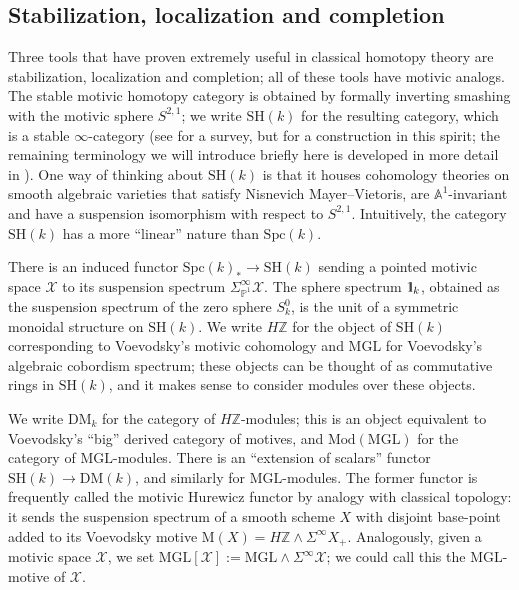 \documentclass[11pt,leqno]{article}
\newcommand{\Z}{{\mathbb Z}}
\newcommand{\aone}{{\mathbb A}^1}
\newcommand{\pone}{{\mathbb P}^1}
\renewcommand{\1}{{\rm 1\hspace*{-0.4ex}%
\rule{0.1ex}{1.52ex}\hspace*{0.2ex}}}
\newcommand{\SH}{{\mathrm{SH}}}
\newcommand{\Spc}{\mathrm{Spc}}
\newcommand{\<}[1]{{\langle}#1 {\rangle}}
\newcounter{intro}
\theoremstyle{plain}
\theoremstyle{definition}
\theoremstyle{remark}
\numberwithin{equation}{subsection}
\begin{document}
\subsection{Stabilization, localization and completion}
\label{ss:stabloccomp}
Three tools that have proven extremely useful in classical homotopy theory are stabilization, localization and completion; all of these tools have motivic analogs.  The stable motivic homotopy category is obtained by formally inverting smashing with the motivic sphere $S^{2,1}$; we write $\SH(k)$ for the resulting category, which is a stable $\infty$-category (see \cite{VICM} for a survey, but \cite[\S 6]{Hoyois2017SixOperations} for a construction in this spirit; the remaining terminology we will introduce briefly here is developed in more detail in \cite[\S 2]{ABHFreudenthal}).  One way of thinking about $\SH(k)$ is that it houses cohomology theories on smooth algebraic varieties that satisfy Nisnevich Mayer--Vietoris, are $\aone$-invariant and have a suspension isomorphism with respect to $S^{2,1}$.  Intuitively, the category $\SH(k)$ has a more ``linear'' nature than $\Spc(k)$.  

There is an induced functor $\Spc(k)_* \to \SH(k)$ sending a pointed motivic space $\mathscr{X}$ to its suspension spectrum $\Sigma^{\infty}_{\pone} \mathscr{X}$.  The sphere spectrum $\1_k$, obtained as the suspension spectrum of the zero sphere $S^0_k$, is the unit of a symmetric monoidal structure on $\SH(k)$.  We write $H\Z$ for the object of $\SH(k)$ corresponding to Voevodsky's motivic cohomology and $\mathrm{MGL}$ for Voevodsky's algebraic cobordism spectrum; these objects can be thought of as commutative rings in $\SH(k)$, and it makes sense to consider modules over these objects.  

We write $\mathrm{DM}_k$ for the category of $H\Z$-modules; this is an object equivalent to Voevodsky's ``big'' derived category of motives, and $\mathrm{Mod}(\mathrm{MGL})$ for the category of $\mathrm{MGL}$-modules.  There is an ``extension of scalars'' functor $\SH(k) \to \mathrm{DM}(k)$, and similarly for $\mathrm{MGL}$-modules.  The former functor is frequently called the motivic Hurewicz functor by analogy with classical topology: it sends the suspension spectrum of a smooth scheme $X$ with disjoint base-point added to its Voevodsky motive $\mathrm{M}(X) = H\Z \wedge \Sigma^{\infty}X_+$.  Analogously, given a motivic space $\mathscr{X}$, we set $\mathrm{MGL}[\mathscr{X}] := \mathrm{MGL} \wedge \Sigma^{\infty}\mathscr{X}$; we could call this the $\mathrm{MGL}$-motive of $\mathscr{X}$.
\end{document}
